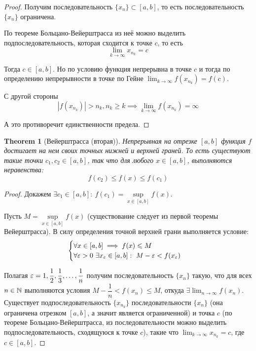 \documentclass[a4paper]{article}
\theoremstyle{named}
\newtheorem*{namedtheorem}{Theorem}
\begin{document}
\begin{colloq}
\begin{proof}
			Получим последовательность $\{x_n\} \subset [a, b]$, то есть последовательность $\{x_n\}$ ограничена.

			По теореме Больцано-Вейерштрасса из неё можно выделить подпоследовательность, которая сходится к точке $c$, то есть
			\begin{equation*}
				\lim_{k \to \infty} x_{n_k} = c
			\end{equation*}

			Тогда $c \in [a, b]$. Но по условию функция непрерывна в точке $c$ и тогда по определению непрерывности в точке по Гейне $\lim_{k \to \infty} f(x_{n_k}) = f(c)$.

			С другой стороны
			\begin{equation*}
				|f(x_{n_k})| > n_k, n_k \geq k \implies \lim_{k \to \infty} f(x_{n_k}) = \infty
			\end{equation*}

			А это противоречит единственности предела.
		\end{proof}

		\begin{namedtheorem}[Вейерштрасса (вторая)]
			Непрерывная на отрезке $[a, b]$ функция $f$ достигает на нем своих точных нижней и верхней граней. То есть существуют такие точки $c_1, c_2 \in [a, b]$, так что для любого $x \in [a, b]$, выполняются неравенства:
			\begin{equation*}
				f(c_2) \leq f(x) \leq f(c_1)
			\end{equation*}
		\end{namedtheorem}

		\begin{proof}
			Докажем $\exists c_1 \in [a, b]: \ f(c_1) = \sup\limits_{x \in [a, b]} f(x)$.

			Пусть $M = \sup\limits_{x \in [a, b]} f(x)$ (существование следует из первой теоремы Вейерштрасса). В силу определения точной верхней грани выполняется условие:
			\begin{equation*}
				\begin{cases}
					\forall x \in [a, b] \implies f(x) \leq M \\
					\forall \eps > 0 \ \exists x_{\eps} \in [a, b]: \ M - \eps < f(x_{\eps}) \\
				\end{cases}
			\end{equation*}

			Полагая $\varepsilon = 1, \dfrac{1}{2}, \dfrac{1}{3}, \dots, \dfrac{1}{n}$ получим последовательность $\{x_n\}$ такую, что для всех $n \in \mathbb{N}$ выполняются условия $M - \dfrac{1}{n} < f(x_n) \leq M$, откуда $\exists \lim_{n \to \infty} f(x_n)$. Существует подпоследовательность $\{x_{n_k}\}$ последовательности $\{x_n\}$ (она ограничена отрезком $[a, b]$, а значит является ограниченной) и точка $c$ (по теореме Больцано-Вейерштрасса, из последовательности можно выделить подпоследовательность, сходящуюся к точке $c$), такие что $\lim_{k \to \infty} x_{n_k} = c$, где $c \in [a, b]$.


\end{proof}
\end{colloq}
\end{document}
